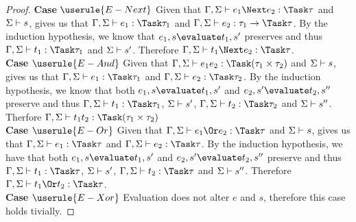 \begin{proof}
  \noindent\textbf{Case} $\userule{E-Next}$
      Given that $\Gamma,\Sigma\infers e_1\Next e_2:\Task \tau$ and
      $\Sigma\vdash s$,  gives us that
      $\Gamma,\Sigma\infers e_1:\Task\tau_1$ and
      $\Gamma,\Sigma\infers e_2:\tau_1 \to \Task \tau$. By the induction
      hypothesis, we know that $e_1,s\evaluate t_1,s'$ preserves and thus
      $\Gamma,\Sigma\infers t_1:\Task\tau_1$ and $\Sigma\vdash s'$. Therefore
      $\Gamma,\Sigma\infers t_1\Next e_2:\Task\tau$.\\

  \noindent\textbf{Case} $\userule{E-And}$
      Given that $\Gamma,\Sigma\infers e_1\And e_2:\Task(\tau_1\times\tau_2)$
      and $\Sigma\vdash s$,  gives us that
      $\Gamma,\Sigma\infers e_1:\Task\tau_1$ and
      $\Gamma,\Sigma\infers e_2:\Task\tau_2$. By the induction hypothesis, we
      know that both $e_1,s\evaluate t_1,s'$ and $e_2,s'\evaluate t_2,s''$
      preserve and thus $\Gamma,\Sigma\infers t_1:\Task\tau_1$,
      $\Sigma\vdash s'$, $\Gamma,\Sigma\infers t_2:\Task\tau_2$ and
      $\Sigma\vdash s''$. Therfore
      $\Gamma,\Sigma\infers t_1\And t_2:\Task(\tau_1\times\tau_2)$\\

  \noindent\textbf{Case} $\userule{E-Or}$
      Given that $\Gamma,\Sigma\infers e_1\Or e_2:\Task\tau$ and $\Sigma\vdash s$,  gives us that $\Gamma,\Sigma\infers e_1:\Task\tau$ and
      $\Gamma,\Sigma\infers e_2:\Task\tau$. By the induction hypothesis, we have that both
      $e_1,s\evaluate t_1,s'$ and $e_2,s'\evaluate t_2,s''$ preserve and thus $\Gamma,\Sigma\infers t_1:\Task\tau$, $\Sigma\vdash s'$,
      $\Gamma,\Sigma\infers t_2:\Task\tau$ and $\Sigma\vdash s''$. Therefore $\Gamma,\Sigma\infers t_1\Or t_2:\Task\tau$.\\

  \noindent\textbf{Case} $\userule{E-Xor}$
      Evaluation does not alter $e$ and $s$, therefore this case holds tivially.

\end{proof}



